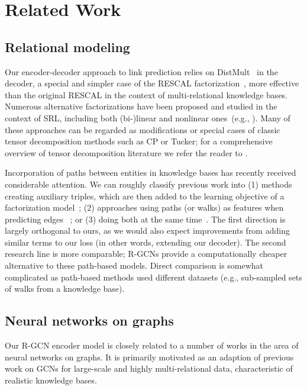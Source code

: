 \section{Related Work}
\subsection{Relational modeling}
Our encoder-decoder approach to link prediction relies on DistMult~\cite{distmult-embedding_entities_and_relations} in the decoder,  a special and simpler case of the RESCAL factorization~\cite{nickel2011three}, more effective than the original RESCAL in the context of multi-relational knowledge bases. Numerous alternative factorizations have been proposed and studied in the context of SRL, including both (bi-)linear and nonlinear ones~(e.g., \cite{bordes2013translating,socher2013reasoning,KaiWei14,nickel2015holographic,complex-complex_embeddings_for_simple_link_prediction}). Many of these approaches can be regarded as modifications or special cases of classic tensor decomposition methods such as CP or Tucker; for a comprehensive overview of tensor decomposition literature we refer the reader to \citet{kolda2009tensor}.

Incorporation of paths between entities in knowledge
bases has recently received considerable attention. We can roughly classify previous work into (1) methods creating auxiliary triples, which are then added to the learning objective of a factorization model~\cite{guu2015traversing,garcia2015composing}; (2) approaches using paths (or walks) as features when predicting edges ~\cite{lin2015modeling}; or (3) doing both at the same time~\cite{neelakantan2015compositional,toutanova2016compositional}. The first direction is largely orthogonal to ours, as we would also expect improvements from adding similar terms to our loss (in other words, extending our decoder). The second research line is more comparable; R-GCNs provide a computationally cheaper alternative to these path-based models. %
Direct comparison is somewhat complicated as path-based methods used different datasets (e.g., sub-sampled sets of walks from a knowledge base).

\subsection{Neural networks on graphs}
Our R-GCN encoder model is closely related to a number of works in the area of neural networks on graphs. It is primarily motivated as an adaption of previous work on GCNs \cite{bruna2014spectral,duvenaud2015convolutional,defferrard2016convolutional,kipf2016semi} for large-scale and highly multi-relational data, characteristic of realistic knowledge bases.

